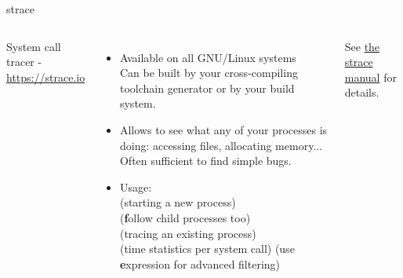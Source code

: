 \begin{frame}[fragile]{strace}
  \begin{columns}
  \small
  System call tracer - \url{https://strace.io}
  \begin{itemize}
  \item Available on all GNU/Linux systems\\
        Can be built by your cross-compiling toolchain generator or by your build system.
  \item Allows to see what any of your processes is doing: accessing files, allocating memory...
        Often sufficient to find simple bugs.
  \item Usage:\\
     (starting a new process)\\
     ({\bf f}ollow child processes too)\\
     (tracing an existing process)\\
     (time statistics per system call)
     (use {\bf e}xpression for advanced filtering)
  \end{itemize}
  See \href{https://man7.org/linux/man-pages/man1/strace.1.html}{the strace manual} for details.

\end{columns}
\end{frame}
